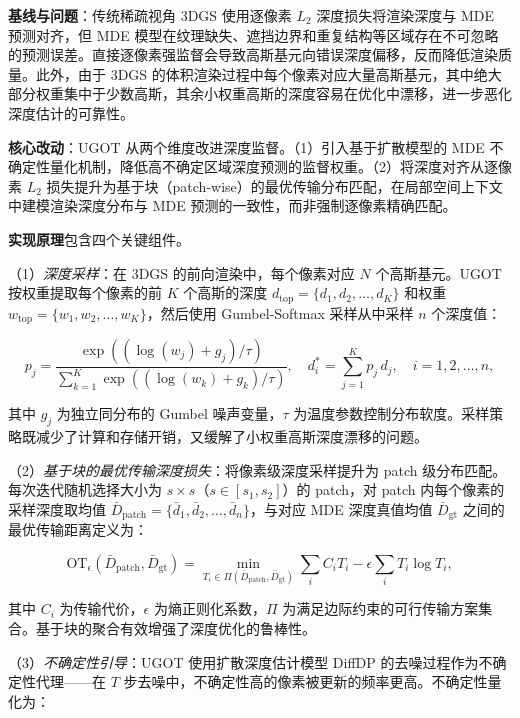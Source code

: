 \textbf{基线与问题}：传统稀疏视角 3DGS 使用逐像素 $L_2$ 深度损失将渲染深度与 MDE 预测对齐，但 MDE 模型在纹理缺失、遮挡边界和重复结构等区域存在不可忽略的预测误差。直接逐像素强监督会导致高斯基元向错误深度偏移，反而降低渲染质量。此外，由于 3DGS 的体积渲染过程中每个像素对应大量高斯基元，其中绝大部分权重集中于少数高斯，其余小权重高斯的深度容易在优化中漂移，进一步恶化深度估计的可靠性。

\textbf{核心改动}：UGOT 从两个维度改进深度监督。（1）引入基于扩散模型的 MDE 不确定性量化机制，降低高不确定区域深度预测的监督权重。（2）将深度对齐从逐像素 $L_2$ 损失提升为基于块（patch-wise）的最优传输分布匹配，在局部空间上下文中建模渲染深度分布与 MDE 预测的一致性，而非强制逐像素精确匹配。

\textbf{实现原理}包含四个关键组件。

（1）\textit{深度采样}：在 3DGS 的前向渲染中，每个像素对应 $N$ 个高斯基元。UGOT 按权重提取每个像素的前 $K$ 个高斯的深度 $d_{\mathrm{top}} = \{d_1, d_2, \ldots, d_K\}$ 和权重 $w_{\mathrm{top}} = \{w_1, w_2, \ldots, w_K\}$，然后使用 Gumbel-Softmax 采样从中采样 $n$ 个深度值：

\begin{equation*}
p_j = \frac{\exp((\log(w_j) + g_j) / \tau)}{\sum_{k=1}^{K} \exp((\log(w_k) + g_k) / \tau)}, \quad d^*_i = \sum_{j=1}^{K} p_j \, d_j, \quad i = 1, 2, \ldots, n,
\end{equation*}

其中 $g_j$ 为独立同分布的 Gumbel 噪声变量，$\tau$ 为温度参数控制分布软度。采样策略既减少了计算和存储开销，又缓解了小权重高斯深度漂移的问题。

（2）\textit{基于块的最优传输深度损失}：将像素级深度采样提升为 patch 级分布匹配。每次迭代随机选择大小为 $s \times s$（$s \in [s_1, s_2]$）的 patch，对 patch 内每个像素的采样深度取均值 $\bar{D}_{\mathrm{patch}} = \{\bar{d}_1, \bar{d}_2, \ldots, \bar{d}_n\}$，与对应 MDE 深度真值均值 $\bar{D}_{\mathrm{gt}}$ 之间的最优传输距离定义为：

\begin{equation*}
\mathrm{OT}_\epsilon(\bar{D}_{\mathrm{patch}}, \bar{D}_{\mathrm{gt}}) = \min_{T_i \in \Pi(\bar{D}_{\mathrm{patch}}, \bar{D}_{\mathrm{gt}})} \sum_i C_i T_i - \epsilon \sum_i T_i \log T_i,
\end{equation*}

其中 $C_i$ 为传输代价，$\epsilon$ 为熵正则化系数，$\Pi$ 为满足边际约束的可行传输方案集合。基于块的聚合有效增强了深度优化的鲁棒性。

（3）\textit{不确定性引导}：UGOT 使用扩散深度估计模型 DiffDP 的去噪过程作为不确定性代理——在 $T$ 步去噪中，不确定性高的像素被更新的频率更高。不确定性量化为：

